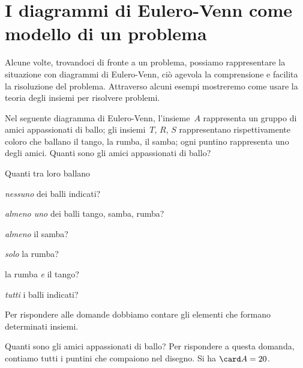 {\section{I diagrammi di Eulero-Venn come modello di un problema}
\label{sec:insiemi_problemi}

Alcune volte, trovandoci di fronte a un problema, possiamo rappresentare
la situazione con diagrammi di Eulero-Venn, ciò agevola la
comprensione e facilita la risoluzione del problema. Attraverso alcuni
esempi mostreremo come usare la teoria degli insiemi per risolvere
problemi.

 \begin{esempio}
Nel seguente diagramma di Eulero-Venn, l'insieme~\(A\) rappresenta un 
gruppo di 
amici appassionati di ballo; gli insiemi~\(T\), \(R\),
\(S\) rappresentano rispettivamente coloro che ballano il tango, la rumba, 
il samba; ogni puntino rappresenta uno degli amici.
Quanti sono gli amici appassionati di ballo?

\begin{minipage}{.59 \textwidth}
Quanti tra loro ballano
\begin{enumeratea}
\item \emph{nessuno} dei balli indicati?
\item \emph{almeno uno} dei balli tango, samba, rumba?
\item \emph{almeno} il samba?
\item \emph{solo} la rumba?
\item la rumba \emph{e} il tango?
\item \emph{tutti} i balli indicati?
\end{enumeratea}
\end{minipage}
\hfill
\begin{minipage}{.39 \textwidth}
\begin{center}
 
\end{center}
\end{minipage}

Per rispondere alle domande dobbiamo contare gli elementi che formano 
determinati insiemi.

Quanti sono gli amici appassionati di ballo? Per rispondere a questa
domanda, contiamo tutti i puntini che compaiono nel disegno. Si ha 
\(\card A=20\).


\end{esempio}}
